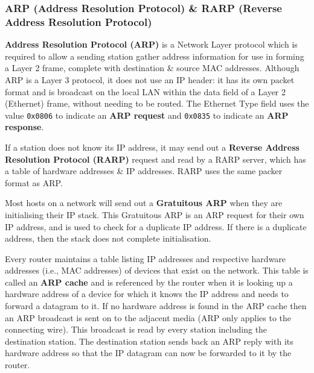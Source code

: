 \documentclass[11pt]{article}
\begin{document}
\subsubsection{ARP (Address Resolution Protocol) \& RARP (Reverse Address Resolution Protocol)}
\textbf{Address Resolution Protocol (ARP)} is a Network Layer protocol which is required to allow a sending station gather address information for use in forming a Layer 2 frame, complete with destination 
\& source MAC addresses.
Although ARP is a Layer 3 protocol, it does not use an IP header: it has its own packet format and is broadcast on the local LAN within the data field of a Layer 2 (Ethernet) frame, without needing to be 
routed.
The Ethernet Type field uses the value \verb|0x0806| to indicate an \textbf{ARP request} and \verb|0x0835| to indicate an \textbf{ARP response}.

If a station does not know its IP address, it may send out a \textbf{Reverse Address Resolution Protocol (RARP)} request and read by a RARP server, which has a table of hardware addresses \& IP addresses.
RARP uses the same packer format as ARP.

Most hosts on a network will send out a \textbf{Gratuitous ARP} when they are initialising their IP stack. 
This Gratuitous ARP is an ARP request for their own IP address, and is used to check for a duplicate IP address. 
If there is a duplicate address, then the stack does not complete initialisation.

Every router maintains a table listing IP addresses and respective hardware addresses (i.e., MAC addresses) of devices that exist on the network.
This table is called an \textbf{ARP cache} and is referenced by the router when it is looking up a hardware address of a device for which it knows the IP address and needs to forward a datagram to it.
If no hardware address is found in the ARP cache then an ARP broadcast is sent on to the adjacent  media (ARP only applies to the connecting wire).
This broadcast is read by every station including the destination station.
The destination station sends back an ARP reply with its hardware address so that the IP datagram can now be forwarded to it by the router.
\end{document}
